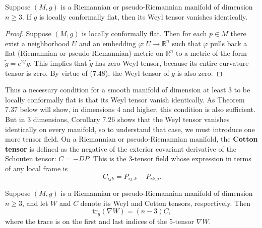 \begin{corollary}
\label{cor:weyl-zero-locally-conformally-flat}
Suppose $(M,g)$ is a Riemannian or pseudo-Riemannian manifold of dimension $n \geq 3$. If $g$ is locally conformally flat, then its Weyl tensor vanishes identically.
\end{corollary}

\begin{proof}
Suppose $(M,g)$ is locally conformally flat. Then for each $p \in M$ there exist a neighborhood $U$ and an embedding $\varphi : U \to \mathbb{R}^n$ such that $\varphi$ pulls back a flat (Riemannian or pseudo-Riemannian) metric on $\mathbb{R}^n$ to a metric of the form $\tilde{g} = e^{2f}g$. This implies that $\tilde{g}$ has zero Weyl tensor, because its entire curvature tensor is zero. By virtue of (7.48), the Weyl tensor of $g$ is also zero.
\end{proof}

Thus a necessary condition for a smooth manifold of dimension at least 3 to be locally conformally flat is that its Weyl tensor vanish identically. As Theorem 7.37 below will show, in dimensions 4 and higher, this condition is also sufficient. But in 3 dimensions, Corollary 7.26 shows that the Weyl tensor vanishes identically on every manifold, so to understand that case, we must introduce one more tensor field. On a Riemannian or pseudo-Riemannian manifold, the \textbf{Cotton tensor} is defined as the negative of the exterior covariant derivative of the Schouten tensor: $C = -DP$. This is the 3-tensor field whose expression in terms of any local frame is
\begin{equation}
C_{ijk} = P_{ij;k} - P_{ik;j}.
\tag{7.49}
\end{equation}

\begin{proposition}
\label{prop:trace-covariant-derivative-weyl}
Suppose $(M,g)$ is a Riemannian or pseudo-Riemannian manifold of dimension $n \geq 3$, and let $W$ and $C$ denote its Weyl and Cotton tensors, respectively. Then
\begin{equation}
\mathrm{tr}_g(\nabla W) = (n-3)C,
\tag{7.50}
\end{equation}
where the trace is on the first and last indices of the 5-tensor $\nabla W$.
\end{proposition}

